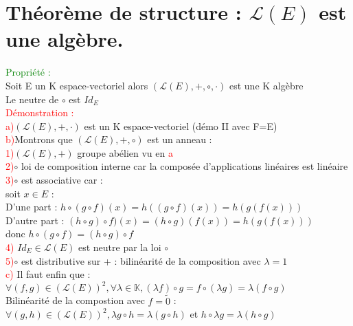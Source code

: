 \documentclass{article}
\begin{document}
\section{Théorème de structure : $\mathcal{L}(E)$ est une algèbre.}
\textcolor{green}{Propriété :} \\ 
Soit E un K espace-vectoriel alors $(\mathcal{L}(E),+, \circ ,\cdot)$ est une K algèbre \\ 
Le neutre de $\circ$ est $Id_E$ \\ 
\textcolor{red}{Démonstration :} \\ 
\textcolor{red}{a)}$(\mathcal{L}(E), + , \cdot)$ est un K espace-vectoriel (démo II avec F=E) \\ 
\textcolor{red}{b)}Montrons que $(\mathcal{L}(E),+,\circ)$ est un anneau : \\ 
\textcolor{red}{1)}$(\mathcal{L}(E),+)$ groupe abélien vu en \textcolor{red}{a} \\ 
\textcolor{red}{2)}$\circ$ loi de composition interne car la composée d'applications linéaires est linéaire \\
\textcolor{red}{3)}$\circ$ est associative car : \\ 
soit $x \in E$ : \\ 
D'une part : $h \circ (g \circ f)(x)=h((g\circ f)(x))= h(g(f(x)))$ \\ 
D'autre part : $(h \circ g) \circ f)(x)=(h \circ g)(f(x))=h(g(f(x)))$ \\ 
donc $h \circ (g \circ f)=(h \circ g) \circ f$ \\ 
\textcolor{red}{4)} $Id_E \in \mathcal{L}(E)$ est neutre par la loi $\circ$ \\ 
\textcolor{red}{5)}$\circ$ est distributive sur + : bilinéarité de la composition avec $\lambda =1$ \\ 
\textcolor{red}{c)} Il faut enfin que : \\ 
$\forall(f,g) \in (\mathcal{L}(E))^2,\forall \lambda \in \mathbb{K},(\lambda f) \circ g=f \circ (\lambda g) = \lambda (f \circ g)$ \\
Bilinéarité de la compostion avec $f=\tilde{0}$ : \\ 
$\forall (g,h) \in (\mathcal{L}(E))^2, \lambda g \circ h= \lambda (g \circ h)$ et $h \circ \lambda g = \lambda (h \circ g)$
\end{document}

